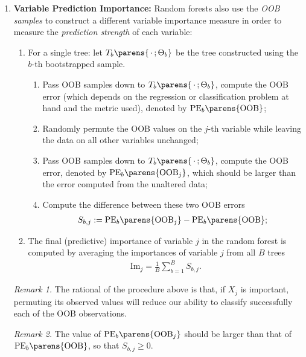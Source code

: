 \documentclass[12pt]{article}
\begin{document}
\begin{enumerate}[label=\textbf{\arabic*.}]
	\item \textbf{Variable Prediction Importance:} Random forests also use the \emph{OOB samples} to construct a different variable importance measure in order to measure the \textit{prediction strength} of each variable: 
	\begin{enumerate}
		\item For a single tree: let $T_b \parens{\,\cdot\,; \Theta_b}$ be the tree constructed using the $b$-th bootstrapped sample. 
		\begin{enumerate}
		 	\item Pass OOB samples down to $T_b \parens{\,\cdot\,; \Theta_b}$, compute the OOB error (which depends on the regression or classification problem at hand and the metric used), denoted by $\mathrm{PE}_{b} \parens{\mathrm{OOB}}$; 
		 	\item Randomly permute the OOB values on the $j$-th variable while leaving the data on all other variables unchanged; 
		 	\item Pass OOB samples down to $T_b \parens{\,\cdot\,; \Theta_b}$, compute the OOB error, denoted by $\mathrm{PE}_{b} \parens{\mathrm{OOB}_j}$, which should be larger than the error computed from the unaltered data; 
		 	\item Compute the difference between these two OOB errors 
		 	\begin{align*}
		 		S_{b, j} := \mathrm{PE}_{b} \parens{\mathrm{OOB}_j} - \mathrm{PE}_{b} \parens{\mathrm{OOB}}; 
		 	\end{align*}
	\end{enumerate}
	\item The final (predictive) importance of variable $j$ in the random forest is computed by averaging the importances of variable $j$ from all $B$ trees 
	\begin{align*}
		\mathrm{Im}_j = \frac{1}{B} \sum_{b=1}^B S_{b, j}. 
	\end{align*}
	\end{enumerate}
	
	\textit{Remark 1.} The rational of the procedure above is that, if $X_j$ is important, permuting its observed values will reduce our ability to classify successfully each of the OOB observations. 
	
	\textit{Remark 2.} The value of $\mathrm{PE}_{b} \parens{\mathrm{OOB}_j}$ should be larger than that of $\mathrm{PE}_{b} \parens{\mathrm{OOB}}$, so that $S_{b,j} \ge 0$. 


\end{enumerate}
\end{document}
